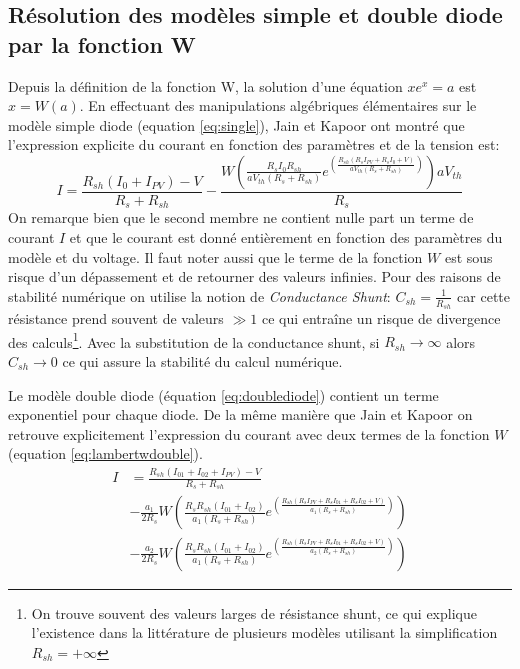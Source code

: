 \subsection{Résolution des modèles simple et double diode par la fonction W}
Depuis la définition de la fonction W, la solution d'une équation $xe^x = a$ est $x = W(a)$. En effectuant des manipulations algébriques élémentaires sur le modèle simple diode (equation \ref{eq:single}), Jain et Kapoor ont montré que l'expression explicite du courant en fonction des paramètres et de la tension est:
\begin{equation}
  \label{eq:lambertwsingle}
  I = \frac{R_{sh}(I_0 + I_{PV}) - V}{R_s + R_{sh}} - \frac{W\left(\frac{R_s I_0 R_{sh}}{a V_{th}(R_s + R_{sh})}e^{\left(\frac{R_{sh}(R_s I_{PV} + R_s I_0 + V)}{a V_{th} (R_s + R_{sh})}\right)}\right)aV_{th}}{R_s}
\end{equation}
On remarque bien que le second membre ne contient nulle part un terme de courant $I$ et que le courant est donné entièrement en fonction des paramètres du modèle et du voltage. Il faut noter aussi que le terme de la fonction $W$ est sous risque d'un dépassement et de retourner des valeurs infinies. Pour des raisons de stabilité numérique on utilise la notion de \textit{Conductance Shunt}: $C_{sh} = \frac{1}{R_{sh}}$ car cette résistance prend souvent de valeurs $\gg 1$ ce qui entraîne un risque de divergence des calculs\footnote{On trouve souvent des valeurs larges de résistance shunt, ce qui explique l'existence dans la littérature de plusieurs modèles utilisant la simplification $R_{sh} = + \infty$}. Avec la substitution de la conductance shunt, si $R_{sh}\rightarrow\infty$ alors $C_{sh} \rightarrow 0$ ce qui assure la stabilité du calcul numérique.

Le modèle double diode (équation \ref{eq:doublediode}) contient un terme exponentiel pour chaque diode. De la même manière que Jain et Kapoor on retrouve explicitement l'expression du courant avec deux termes de la fonction $W$ (equation \ref{eq:lambertwdouble}).
\begin{equation}
  \label{eq:lambertwdouble}
  \begin{split}
    I &= \frac{R_{sh} (I_{01} + I_{02} + I_{PV}) - V}{R_s + R_{sh}}\\ 
    &- \frac{a_1}{2 R_s} W\left( \frac{R_s R_{sh}(I_{01} + I_{02})}{a_1 (R_s + R_{sh})}e^{\left(\frac{R_{sh}(R_s I_{PV} + R_s I_{01} + R_s I_{02} + V)}{a_1 (R_s + R_{sh})}\right)}\right)\\ 
    &- \frac{a_2}{2 R_s} W\left( \frac{R_s R_{sh}(I_{01} + I_{02})}{a_1 (R_s + R_{sh})}e^{\left(\frac{R_{sh}(R_s I_{PV} + R_s I_{01} + R_s I_{02} + V)}{a_2 (R_s + R_{sh})}\right)}\right)
  \end{split}
\end{equation}

